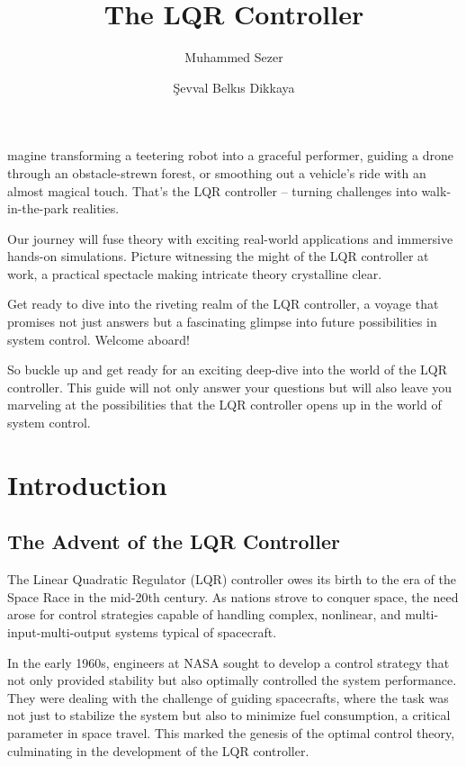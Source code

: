 \documentclass[11pt,twocolumn,twoside,lineno]{pnas-new}
\title{The LQR Controller}
\author[a,b]{Muhammed Sezer}
\author[a,b]{Şevval Belkıs Dikkaya}
\affil[a]{\href{https://www.metu.edu.tr/}{Middle East Technical University}}
\affil[b]{Orion Robotics Ltd.}
\begin{document}
\maketitle
\thispagestyle{firststyle}

magine transforming a teetering robot into a graceful performer, guiding a drone through an obstacle-strewn forest, or smoothing out a vehicle's ride with an almost magical touch. That's the LQR controller – turning challenges into walk-in-the-park realities.

Our journey will fuse theory with exciting real-world applications and immersive hands-on simulations. Picture witnessing the might of the LQR controller at work, a practical spectacle making intricate theory crystalline clear.

Get ready to dive into the riveting realm of the LQR controller, a voyage that promises not just answers but a fascinating glimpse into future possibilities in system control. Welcome aboard!

So buckle up and get ready for an exciting deep-dive into the world of the LQR controller. This guide will not only answer your questions but will also leave you marveling at the possibilities that the LQR controller opens up in the world of system control.

\section*{Introduction}
\subsection*{The Advent of the LQR Controller}

The Linear Quadratic Regulator (LQR) controller owes its birth to the era of the Space Race in the mid-20th century. As nations strove to conquer space, the need arose for control strategies capable of handling complex, nonlinear, and multi-input-multi-output systems typical of spacecraft.

In the early 1960s, engineers at NASA sought to develop a control strategy that not only provided stability but also optimally controlled the system performance. They were dealing with the challenge of guiding spacecrafts, where the task was not just to stabilize the system but also to minimize fuel consumption, a critical parameter in space travel. This marked the genesis of the optimal control theory, culminating in the development of the LQR controller.
\end{document}
